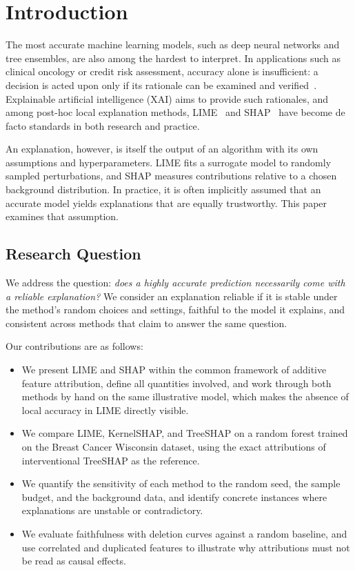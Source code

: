 \section{Introduction}
\label{sec:introduction}

The most accurate machine learning models, such as deep neural networks and tree ensembles, are also among the hardest to interpret. In applications such as clinical oncology or credit risk assessment, accuracy alone is insufficient: a decision is acted upon only if its rationale can be examined and verified~\cite{BARREDOARRIETA202082}. Explainable artificial intelligence (XAI) aims to provide such rationales, and among post-hoc local explanation methods, LIME~\cite{ribeiro-etal-2016-trust} and SHAP~\cite{NIPS2017_8a20a862} have become de facto standards in both research and practice.

An explanation, however, is itself the output of an algorithm with its own assumptions and hyperparameters. LIME fits a surrogate model to randomly sampled perturbations, and SHAP measures contributions relative to a chosen background distribution. In practice, it is often implicitly assumed that an accurate model yields explanations that are equally trustworthy. This paper examines that assumption.

\subsection{Research Question}
\label{sec:guiding-question}

We address the question: \textit{does a highly accurate prediction necessarily come with a reliable explanation?} We consider an explanation reliable if it is stable under the method's random choices and settings, faithful to the model it explains, and consistent across methods that claim to answer the same question.

Our contributions are as follows:
\begin{itemize}
    \item We present LIME and SHAP within the common framework of additive feature attribution, define all quantities involved, and work through both methods by hand on the same illustrative model, which makes the absence of local accuracy in LIME directly visible.
    \item We compare LIME, KernelSHAP, and TreeSHAP on a random forest trained on the Breast Cancer Wisconsin dataset, using the exact attributions of interventional TreeSHAP as the reference.
    \item We quantify the sensitivity of each method to the random seed, the sample budget, and the background data, and identify concrete instances where explanations are unstable or contradictory.
    \item We evaluate faithfulness with deletion curves against a random baseline, and use correlated and duplicated features to illustrate why attributions must not be read as causal effects.
\end{itemize}

